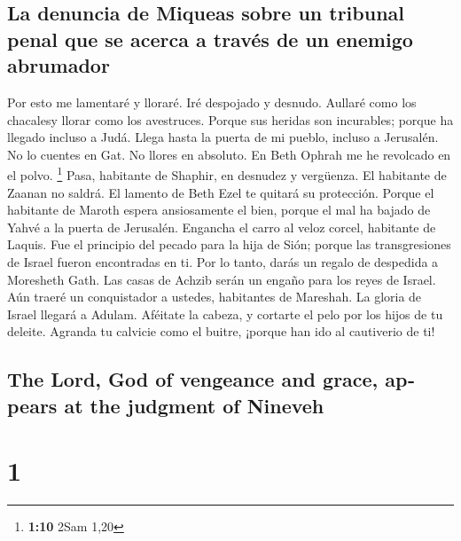 \begin{paracol}{2}
\hypertarget{la-denuncia-de-miqueas-sobre-un-tribunal-penal-que-se-acerca-a-travuxe9s-de-un-enemigo-abrumador}{%
\subsection{La denuncia de Miqueas sobre un tribunal penal que se acerca
a través de un enemigo
abrumador}\label{la-denuncia-de-miqueas-sobre-un-tribunal-penal-que-se-acerca-a-travuxe9s-de-un-enemigo-abrumador}}

 Por esto me lamentaré y lloraré. Iré despojado y desnudo.
Aullaré como los chacalesy llorar como los avestruces. 
Porque sus heridas son incurables; porque ha llegado incluso a Judá.
Llega hasta la puerta de mi pueblo, incluso a Jerusalén. 
No lo cuentes en Gat. No llores en absoluto. En Beth Ophrah me he
revolcado en el polvo. \footnote{\textbf{1:10} 2Sam 1,20}
 Pasa, habitante de Shaphir, en desnudez y vergüenza. El
habitante de Zaanan no saldrá. El lamento de Beth Ezel te quitará su
protección.  Porque el habitante de Maroth espera
ansiosamente el bien, porque el mal ha bajado de Yahvé a la puerta de
Jerusalén.  Engancha el carro al veloz corcel, habitante
de Laquis. Fue el principio del pecado para la hija de Sión; porque las
transgresiones de Israel fueron encontradas en ti.  Por
lo tanto, darás un regalo de despedida a Moresheth Gath. Las casas de
Achzib serán un engaño para los reyes de Israel.  Aún
traeré un conquistador a ustedes, habitantes de Mareshah. La gloria de
Israel llegará a Adulam.  Aféitate la cabeza, y cortarte
el pelo por los hijos de tu deleite. Agranda tu calvicie como el buitre,
¡porque han ido al cautiverio de ti!

\switchcolumn
\begin{otherlanguage}{english}

\hypertarget{the-lord-god-of-vengeance-and-grace-appears-at-the-judgment-of-nineveh}{%
\subsection{The Lord, God of vengeance and grace, appears at the
judgment of
Nineveh}\label{the-lord-god-of-vengeance-and-grace-appears-at-the-judgment-of-nineveh}}

\hypertarget{section-1}{%
\section{1}\label{section-1}}


\end{otherlanguage}
\end{paracol}

